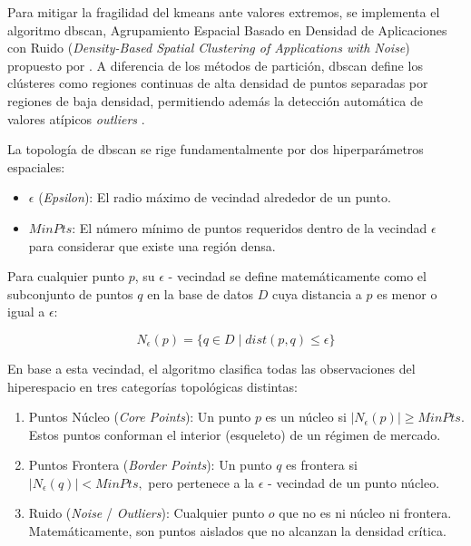 \documentclass[
]{article}
\begin{document}
	Para mitigar la fragilidad del \gls{kmeans} ante valores extremos, se
	implementa el algoritmo \gls{dbscan}, Agrupamiento Espacial Basado en Densidad de Aplicaciones con Ruido (\emph{Density-Based Spatial Clustering
		of Applications with Noise}) propuesto por \textcite{ester1996}. A diferencia de los métodos de partición,
	\gls{dbscan} define los clústeres como regiones continuas de alta densidad de
	puntos separadas por regiones de baja densidad, permitiendo además la detección automática de valores atípicos \emph{outliers} \parencite{schubert2017}.
	
	La topología de \gls{dbscan} se rige fundamentalmente por dos hiperparámetros
	espaciales:
	
	\begin{itemize}
		\item
		\(\epsilon\) (\emph{Epsilon}): El radio máximo de vecindad alrededor
		de un punto.
		\item
		\(MinPts\): El número mínimo de puntos requeridos dentro de la
		vecindad \(\epsilon\) para considerar que existe una región densa.
	\end{itemize}
	
	Para cualquier punto \(p\), su \(\epsilon\) - vecindad se define
	matemáticamente como el subconjunto de puntos \(q\) en la base de datos
	\(D\) cuya distancia a \(p\) es menor o igual a \(\epsilon\):

	\begin{equation}
	\label{eq:dbscan_neighborhood}
	N_{\epsilon}(p) = \{q \in D \mid dist(p,q) \leq \epsilon\}
	\end{equation}
	
	En base a esta vecindad, el algoritmo clasifica todas las observaciones
	del hiperespacio en tres categorías topológicas distintas:
	
	\begin{enumerate}
		\def\labelenumi{\arabic{enumi}.}
		\item
		Puntos Núcleo (\emph{Core Points}): Un punto \(p\) es un núcleo si
		\(\left| N_{\epsilon}(p) \right| \geq MinPts\). Estos puntos conforman
		el interior (esqueleto) de un régimen de mercado.
		\item
		Puntos Frontera (\emph{Border Points}): Un punto \(q\) es frontera si
		\(\left| N_{\epsilon}(q) \right| < MinPts,\) pero pertenece a la
		\(\epsilon\) - vecindad de un punto núcleo.
		\item
		Ruido (\emph{Noise} / \emph{Outliers}): Cualquier punto \(o\) que no
		es ni núcleo ni frontera. Matemáticamente, son puntos aislados que no
		alcanzan la densidad crítica.
	\end{enumerate}
	
\end{document}
